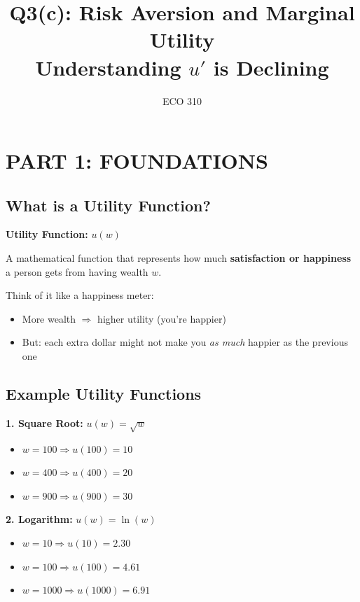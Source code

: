 \documentclass[12pt]{article}
\title{\LARGE Q3(c): Risk Aversion and Marginal Utility\\Understanding $u'$ is Declining}
\author{ECO 310}
\date{}
\begin{document}
\maketitle

\section*{PART 1: FOUNDATIONS}

\subsection*{What is a Utility Function?}

\begin{center}
\colorbox{blue!20}{
\begin{minipage}{0.9\textwidth}
\textbf{Utility Function:} $u(w)$

A mathematical function that represents how much \textbf{satisfaction or happiness} a person gets from having wealth $w$.
\end{minipage}
}
\end{center}

Think of it like a happiness meter:
\begin{itemize}
    \item More wealth $\Rightarrow$ higher utility (you're happier)
    \item But: each extra dollar might not make you \textit{as much} happier as the previous one
\end{itemize}

\subsection*{Example Utility Functions}

\textbf{1. Square Root:} $u(w) = \sqrt{w}$

\begin{itemize}
    \item $w = 100 \Rightarrow u(100) = 10$
    \item $w = 400 \Rightarrow u(400) = 20$
    \item $w = 900 \Rightarrow u(900) = 30$
\end{itemize}

\textbf{2. Logarithm:} $u(w) = \ln(w)$

\begin{itemize}
    \item $w = 10 \Rightarrow u(10) = 2.30$
    \item $w = 100 \Rightarrow u(100) = 4.61$
    \item $w = 1000 \Rightarrow u(1000) = 6.91$
\end{itemize}
\end{document}
